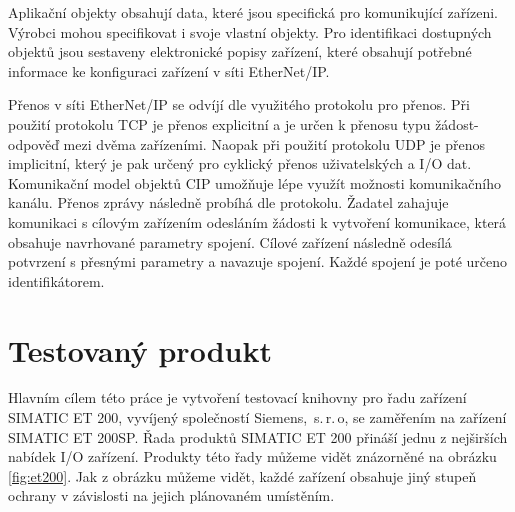 Aplikační objekty obsahují data, které jsou specifická pro komunikující zařízeni. Výrobci mohou specifikovat i svoje vlastní objekty. Pro identifikaci dostupných objektů jsou sestaveny elektronické popisy zařízení, které obsahují potřebné informace ke konfiguraci zařízení v síti EtherNet/IP. 

Přenos v síti EtherNet/IP se odvíjí dle využitého protokolu pro přenos. Při použití protokolu TCP je přenos explicitní a je určen k přenosu typu žádost-odpověď mezi dvěma zařízeními. Naopak při použití protokolu UDP je přenos implicitní, který je pak určený pro cyklický přenos uživatelských a I/O dat. Komunikační model objektů CIP umožňuje lépe využít možnosti komunikačního kanálu. Přenos zprávy následně probíhá dle protokolu. Žadatel zahajuje komunikaci s cílovým zařízením odesláním žádosti k vytvoření komunikace, která obsahuje navrhované parametry spojení. Cílové zařízení následně odesílá potvrzení s přesnými parametry a navazuje spojení. Každé spojení je poté určeno identifikátorem. \cite{ethernet_ip}

\section{Testovaný produkt}

Hlavním cílem této práce je vytvoření testovací knihovny pro řadu zařízení SIMATIC ET 200, vyvíjený společností Siemens,~s.\,{}r.\,{}o, se zaměřením na zařízení SIMATIC ET 200SP. Řada produktů SIMATIC ET 200 přináší jednu z nejširších nabídek I/O zařízení. Produkty této řady můžeme vidět znázorněné na obrázku \ref{fig:et200}. Jak z obrázku můžeme vidět, každé zařízení obsahuje jiný stupeň ochrany v závislosti na jejich plánovaném umístěním. \cite{et200} 

